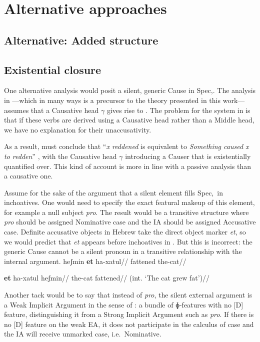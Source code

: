 \section{Alternative approaches} \label{vd:others}

	\subsection{Alternative: Added structure}
	
	\subsection{Existential closure}
One alternative analysis would posit a silent, generic Cause in Spec,\vd. The analysis in \citet[61]{doron03}---which in many ways is a precursor to the theory presented in this work---assumes that a Causative head $\gamma$ gives rise to \thif. The problem for the system in \cite{doron03} is that if these verbs are derived using a Causative head rather than a Middle head, we have no explanation for their unaccusativity.

As a result, \citeauthor{doron03} must conclude that ``\emph{x reddened} is equivalent to \emph{Something caused x to redden}'' \citep[62]{doron03}, with the Causative head $\gamma$ introducing a Causer that is existentially quantified over. This kind of account is more in line with a passive analysis than a causative one.

Assume for the sake of the argument that a silent element fills Spec,\vd~in inchoatives. One would need to specify the exact featural makeup of this element, for example a null subject \emph{pro}. The result would be a transitive structure where \emph{pro} should be assigned Nominative case and the IA should be assigned Accusative case. Definite accusative objects in Hebrew take the direct object marker \emph{et}, so we would predict that \emph{et} appears before inchoatives in \thif. But this is incorrect: the generic Cause cannot be a silent pronoun in a transitive relationship with the internal argument.
\pex
	\a \ljudge{*} \begingl
		\gla heʃmin \textbf{et} ha-xatul//
		\glb fattened  the-cat//
	\endgl
	
	\a \ljudge{*} \begingl
		\gla \textbf{et} ha-xatul heʃmin//
		\glb {} the-cat fattened//
		\glft (int. `The cat grew fat')//
	\endgl
\xe

Another tack would be to say that instead of \emph{pro}, the silent external argument is a Weak Implicit Argument in the sense of \cite{landau10}: a bundle of ɸ-features with no [D] feature, distinguishing it from a Strong Implicit Argument such as \emph{pro}. If there is no [D] feature on the weak EA, it does not participate in the calculus of case and the IA will receive unmarked case, i.e.~Nominative.


